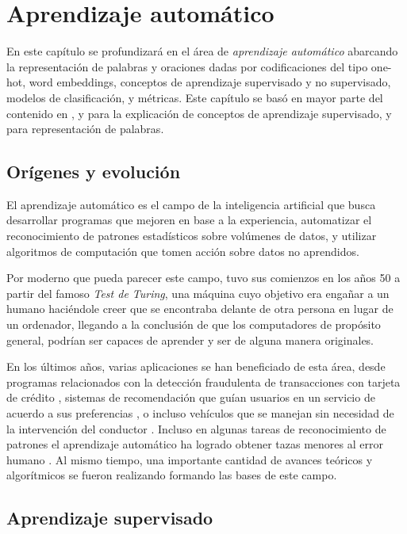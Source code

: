 \chapter{Aprendizaje automático}
\label{ch:lit_ml}

En este capítulo se profundizará en el área de \emph{aprendizaje automático}
abarcando la representación de palabras y oraciones dadas por codificaciones del
tipo one-hot, word embeddings, conceptos de aprendizaje supervisado y no
supervisado, modelos de clasificación, y métricas. Este capítulo se basó en
mayor parte del contenido en \citep{Bishop-2006}, y \citep{Tianqi-2016} para la
explicación de conceptos de aprendizaje supervisado, y
\citep{Bojanowski-Grave-Joulin-Mikolov-2016, Mikolov-2013} para
representación de palabras.

\section{Orígenes y evolución}

El aprendizaje automático es el campo de la inteligencia artificial que busca
desarrollar programas que mejoren en base a la experiencia, automatizar el
reconocimiento de patrones estadísticos sobre volúmenes de datos, y utilizar
algoritmos de computación que tomen acción sobre datos no aprendidos.

Por moderno que pueda parecer este campo, tuvo sus comienzos en los años 50 a
partir del famoso \emph{Test de Turing}, una máquina cuyo objetivo era engañar a
un humano haciéndole creer que se encontraba delante de otra persona en lugar de
un ordenador, llegando a la conclusión de que los computadores de propósito
general, podrían ser capaces de aprender y ser de alguna manera originales.
\citep{test-turing-website}

En los últimos años, varias aplicaciones se han beneficiado de esta área, desde
programas relacionados con la detección fraudulenta de transacciones con tarjeta
de crédito \citep{Fang-2021}, sistemas de recomendación que guían usuarios en un
servicio de acuerdo a sus preferencias \citep{Burke-2007}, o incluso vehículos
que se manejan sin necesidad de la intervención del conductor
\citep{Sorin-2019}. Incluso en algunas tareas de reconocimiento de patrones el
aprendizaje automático ha logrado obtener tazas menores al error humano
\citep{niklas-et-al-2020}. Al mismo tiempo, una importante cantidad de avances
teóricos y algorítmicos se fueron realizando formando las bases de este campo. 

\section{Aprendizaje supervisado}

